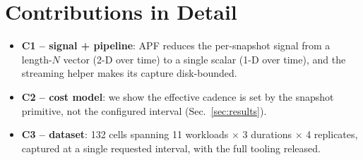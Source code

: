 \documentclass[conference]{IEEEtran}
\begin{document}
\section{Contributions in Detail}
\label{sec:contrib}
\begin{itemize}
  \item \textbf{C1 -- signal + pipeline}: APF reduces the per-snapshot signal
        from a length-$N$ vector (2-D over time) to a single scalar (1-D over
        time), and the streaming helper makes its capture disk-bounded.
  \item \textbf{C2 -- cost model}: we show the effective cadence is set by the
        snapshot primitive, not the configured interval (Sec.~\ref{sec:results}).
  \item \textbf{C3 -- dataset}: 132 cells spanning 11 workloads $\times$ 3
        durations $\times$ 4 replicates, captured at a single requested interval,
        with the full tooling released.
\end{itemize}

\end{document}
